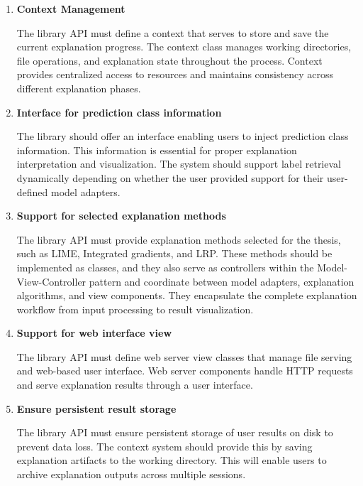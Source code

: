 \documentclass[
    bindingoffset=5mm,  %
    footnoteindent=3mm, %
    hyphenation=true    %
]{src/wut-thesis}
\begin{document}
\begin{enumerate}[itemsep=1\baselineskip]
    \item \textbf{Context Management}

        The library API must define a context that serves to store and save the current explanation progress.
    The context class manages working directories, file operations, and explanation state throughout the process.
    Context provides centralized access to resources and maintains consistency across different explanation phases.

    \item \textbf{Interface for prediction class information}

        The library should offer an interface enabling users to inject prediction class information.
    This information is essential for proper explanation interpretation and visualization.
    The system should support label retrieval dynamically depending on whether the user provided
    support for their user-defined model adapters.

    \item \textbf{Support for selected explanation methods}

        The library API must provide explanation methods selected for the thesis, such as LIME, Integrated gradients, and LRP.
    These methods should be implemented as classes, and they also serve as controllers within
    the Model-View-Controller pattern and coordinate between model adapters, explanation algorithms, and view components. They encapsulate the complete explanation workflow from input processing to result visualization.

    \item \textbf{Support for web interface view}

        The library API must define web server view classes that manage file serving and web-based user interface.
    Web server components handle HTTP requests and serve explanation results through a user interface.

    \item \textbf{Ensure persistent result storage}

        The library API must ensure persistent storage of user results on disk to prevent
    data loss. The context system should provide this by saving explanation artifacts to
    the working directory. This will enable users to archive explanation outputs across 
    multiple sessions.
    
    \end{enumerate}
\end{document}

